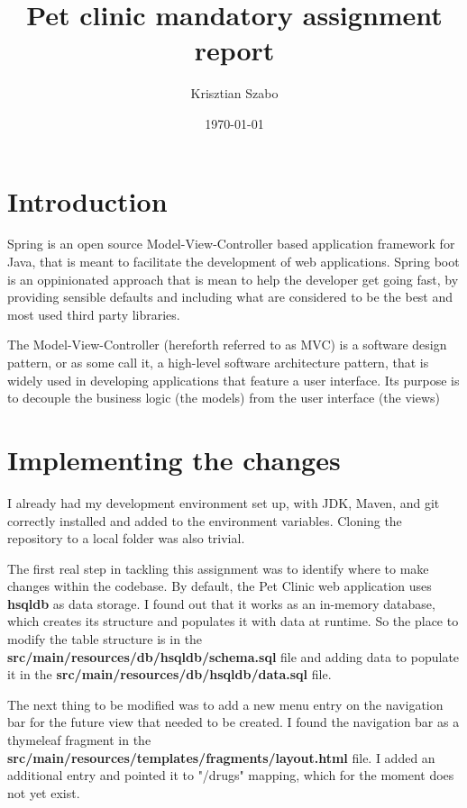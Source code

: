 \documentclass[12pt, a4paper]{article}
\title{Pet clinic mandatory assignment report}
\author{Krisztian Szabo}
\date{\today{}}
\begin{document}
\maketitle
{}
\newpage

\tableofcontents
{}
\newpage

\section{Introduction}
Spring is an open source Model-View-Controller based application framework for Java, that is meant to facilitate the development of web applications. Spring boot is an oppinionated approach that is mean to help the developer get going fast, by providing sensible defaults and including what are considered to be the best and most used third party libraries.

The Model-View-Controller (hereforth referred to as MVC) is a software design pattern, or as some call it, a high-level software architecture pattern, that is widely used in developing applications that feature a user interface. Its purpose is to decouple the business logic (the models) from the user interface (the views)

\section{Implementing the changes}
I already had my development environment set up, with JDK, Maven, and git correctly installed and added to the environment variables. Cloning the repository to a local folder was also trivial.

The first real step in tackling this assignment was to identify where to make changes within the codebase. By default, the Pet Clinic web application uses \textbf{hsqldb} as data storage. I found out that it works as an in-memory database, which creates its structure and populates it with data at runtime. So the place to modify the table structure is in the \textbf{src/main/resources/db/hsqldb/schema.sql} file and adding data to populate it in the \textbf{src/main/resources/db/hsqldb/data.sql} file.

The next thing to be modified was to add a new menu entry on the navigation bar for the future view that needed to be created. I found the navigation bar as a thymeleaf fragment in the \textbf{src/main/resources/templates/fragments/layout.html} file. I added an additional entry and pointed it to "/drugs" mapping, which for the moment does not yet exist.
\end{document}
